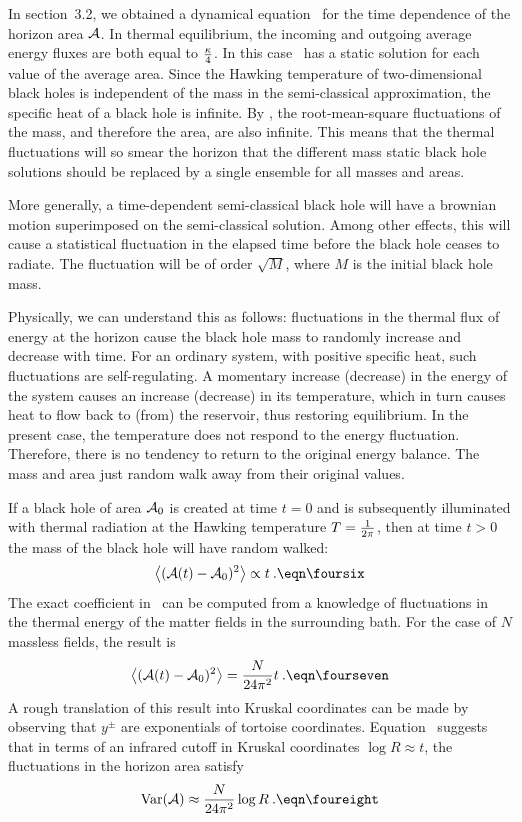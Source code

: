 In section~3.2, we obtained a dynamical equation \threetwentyfive\
for the time dependence of the horizon area ${\cal A}$.  In thermal
equilibrium, the incoming and outgoing average energy fluxes are both
equal to ${\kappa \over 4}$.  In this case \threetwentyfive\ has a
static solution for each value of the average area.  Since the
Hawking temperature of two-dimensional black holes is independent of
the mass in the semi-classical approximation, the specific heat of a
black hole is infinite.  By \fourfive , the root-mean-square
fluctuations of the mass, and therefore the area, are also infinite.
This means that the thermal fluctuations will so smear the horizon
that the different mass static black hole solutions should be
replaced by a single ensemble for all masses and areas.

More generally, a time-dependent semi-classical black hole will have
a brownian motion superimposed on the semi-classical solution.  Among
other effects, this will cause a statistical fluctuation in the
elapsed time before the black hole ceases to radiate.  The
fluctuation will be of order $\sqrt{M}$, where $M$ is the initial
black hole mass.

Physically, we can understand this as follows: fluctuations in the
thermal flux of energy at the horizon cause the black hole mass to
randomly increase and decrease with time.  For an ordinary system,
with positive specific heat, such fluctuations are self-regulating.
A momentary increase (decrease) in the energy of the system causes an
increase (decrease) in its temperature, which in turn causes heat to
flow back to (from) the reservoir, thus restoring equilibrium.  In
the present case, the temperature does not respond to the energy
fluctuation.  Therefore, there is no tendency to return to the
original energy balance.  The mass and area just random walk away
from their original values.

If a black hole of area ${\cal A}_0$ is created at time $t = 0$ and
is subsequently illuminated with thermal radiation at the Hawking
temperature $T = {1 \over 2\pi}$, then at time $t > 0$ the mass of
the black hole will have random walked:
$$
\bigl\langle ({\cal A}(t) - {\cal A}_0)^2
\bigr\rangle \propto t \>.
\eqn\foursix
$$
The exact coefficient in \foursix\ can be computed from a knowledge
of fluctuations in the thermal energy of the matter fields in the
surrounding bath.  For the case of $N$ massless fields, the result is
$$
\bigl\langle ({\cal A}(t) - {\cal A}_0)^2
\bigr\rangle = {N \over 24\pi^2} t \>.
\eqn\fourseven
$$
A rough translation of this result into Kruskal coordinates can be
made by observing that $y^{\pm}$ are exponentials of tortoise
coordinates.  Equation \fourseven\ suggests that in terms of an
infrared cutoff in Kruskal coordinates $\log R \approx t$, the
fluctuations in the horizon area satisfy
$$
\hbox{Var}({\cal A}) \approx {N \over 24\pi^2} \log R \>.
\eqn\foureight
$$

